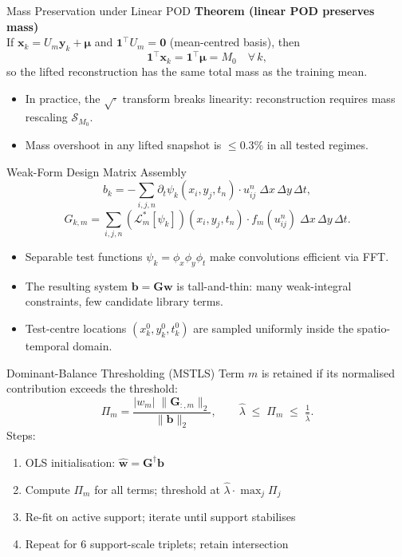 \begin{frame}[noframenumbering]{Mass Preservation under Linear POD}
\centering
\normalsize
\textbf{Theorem (linear POD preserves mass)}\\[0.8em]
If $\mathbf{x}_k = U_m\mathbf{y}_k + \boldsymbol{\mu}$ and $\mathbf{1}^\top U_m = \mathbf{0}$ (mean-centred basis), then
\[
  \mathbf{1}^\top\mathbf{x}_k = \mathbf{1}^\top\boldsymbol{\mu} = M_0 \quad\forall\,k,
\]
so the lifted reconstruction has the same total mass as the training mean.

\medskip
\begin{itemize}
  \item In practice, the $\sqrt{\cdot}$ transform breaks linearity: reconstruction requires mass rescaling $\mathcal{S}_{M_0}$.
  \item Mass overshoot in any lifted snapshot is $\le 0.3\%$ in all tested regimes.
\end{itemize}
\end{frame}

\begin{frame}[noframenumbering,shrink=4]{Weak-Form Design Matrix Assembly}
\small
\[
  b_k = -\!\!\sum_{i,j,n}\!\!\partial_t\psi_k(x_i,y_j,t_n)\cdot u_{ij}^n\;\Delta x\,\Delta y\,\Delta t,
\]
\[
  G_{k,m} = \!\!\sum_{i,j,n}\!\!(\mathcal{L}_m^*[\psi_k])(x_i,y_j,t_n)\cdot f_m(u_{ij}^n)\;\Delta x\,\Delta y\,\Delta t.
\]
\medskip
\begin{itemize}
  \item Separable test functions $\psi_k = \phi_x\phi_y\phi_t$ make convolutions efficient via FFT.
  \item The resulting system $\mathbf{b}=\mathbf{G}\mathbf{w}$ is tall-and-thin: many weak-integral constraints, few candidate library terms.
  \item Test-centre locations $(x_k^0,y_k^0,t_k^0)$ are sampled uniformly inside the spatio-temporal domain.
\end{itemize}
\end{frame}

\begin{frame}[noframenumbering]{Dominant-Balance Thresholding (MSTLS)}
\normalsize
Term $m$ is retained if its normalised contribution exceeds the threshold:
\[
  \Pi_m = \frac{|w_m|\;\|\mathbf{G}_{:,m}\|_2}{\|\mathbf{b}\|_2},
  \qquad
  \hat\lambda \;\le\; \Pi_m \;\le\; \tfrac{1}{\hat\lambda}.
\]
\medskip
Steps:
\begin{enumerate}
  \item OLS initialisation: $\hat{\mathbf{w}} = \mathbf{G}^\dagger\mathbf{b}$
  \item Compute $\Pi_m$ for all terms; threshold at $\hat\lambda\cdot\max_j\Pi_j$
  \item Re-fit on active support; iterate until support stabilises
  \item Repeat for 6 support-scale triplets; retain intersection
\end{enumerate}
\end{frame}

